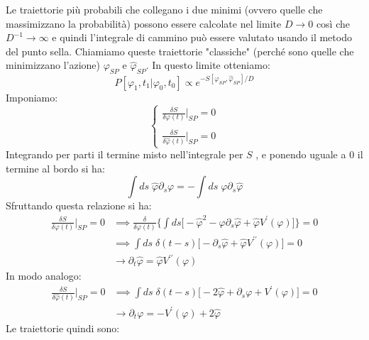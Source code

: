 Le traiettorie più probabili che collegano i due minimi (ovvero quelle che massimizzano la probabilità) possono essere calcolate nel limite $D\rightarrow0$ così che $D^{-1}\rightarrow\infty$ e quindi l'integrale di cammino può essere valutato usando il metodo del punto sella.
Chiamiamo queste traiettorie "classiche" (perché sono quelle che minimizzano l'azione) $\varphi_{SP}$ e $\hat{\varphi}_{SP}$.
In questo limite otteniamo:
\begin{equation}
P[\varphi_{1},t_{1}|\varphi_{0},t_{0}]\propto e^{-S[\varphi_{SP},\hat{\varphi}_{SP}]/D}
\end{equation}
Imponiamo:
\begin{equation} 
\begin{cases}
\frac{\delta S}{\delta\varphi(t)}\Big|_{SP}=0 \\ \\
\frac{\delta S}{\delta\hat{\varphi}(t)}\Big|_{SP}=0
\end{cases} 
\end{equation}
Integrando per parti il termine misto nell’integrale per $S$ , e ponendo uguale a 0 il termine al bordo si ha:
\begin{equation}
\int ds \; \hat{\varphi}\partial_{s}\varphi = -\int ds \; \varphi \partial_{s} \hat{\varphi}
\end{equation}
Sfruttando questa relazione si ha:
\begin{align}
\frac{\delta S}{\delta\varphi(t)} \Big|_{SP} = 0 &\implies \frac{\delta }{\delta\varphi(t)} \Biggl\{ \int ds \Big[-\hat{\varphi}^{2}- \varphi \partial_{s} \hat{\varphi} + \hat{\varphi} V^{\prime}(\varphi) \Big] \Biggr\} =0 \nonumber \\ 
&\implies \int ds \; \delta(t-s) \Big[ -\partial_{s} \hat{\varphi} + \hat{\varphi} V^{\prime\prime}(\varphi) \Big] =0 \nonumber \\ 
&\longrightarrow \partial_{t} \hat{\varphi} = \hat{\varphi} V^{\prime\prime}(\varphi)
\end{align}
In modo analogo:
\begin{align}
\frac{\delta S}{\delta \hat{\varphi}(t)} \Big|_{SP} = 0 &\implies \int ds \; \delta(t-s) \Big[ -2 \hat{\varphi} + \partial_{s} \varphi+ V^{\prime}(\varphi) \Big] =0 \nonumber \\ 
&\longrightarrow \partial_{t} \varphi = - V^{\prime}(\varphi) +2 \hat{\varphi}
\end{align}
Le traiettorie quindi sono:

